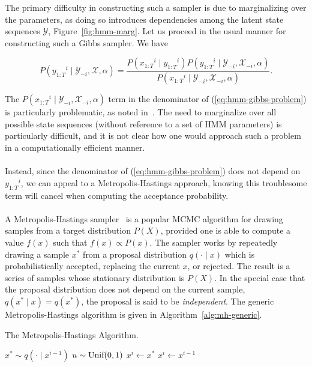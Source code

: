 \documentclass[12pt]{report}
\newcommand{\1}[0]{\mathbbm{1}}
\newcommand{\Unif}[0]{\textnormal{Unif}}
\newcommand{\seq}[3]{\ensuremath{#1_{{#2}:{#3}}}}
\begin{document}
The primary difficulty in constructing such a sampler is due to \mbox{marginalizing} over the parameters,
as doing so introduces dependencies among the latent state sequences $\mathcal{Y}$, Figure~\ref{fig:hmm-marg}.
Let us proceed in the usual manner for constructing such a Gibbs sampler. We have

\begin{equation}
    P(\seq{y}{1}{T}^i \mid \mathcal{Y}_{-i}, \mathcal{X}, \alpha)
    = \frac{P(\seq{x}{1}{T}^i \mid \seq{y}{1}{T}^i)P(\seq{y}{1}{T}^i \mid \mathcal{Y}_{-i}, \mathcal{X}_{-i}, \alpha)}
      {P(\seq{x}{1}{T}^i \mid \mathcal{Y}_{-i}, \mathcal{X}_{-i}, \alpha)}. \label{eq:hmm-gibbs-problem}
\end{equation}

The $P(\seq{x}{1}{T}^i \mid \mathcal{Y}_{-i}, \mathcal{X}_{-i}, \alpha)$ term in the denominator
of (\ref{eq:hmm-gibbs-problem}) is particularly problematic, as noted in~\cite{pcfg-bayesian-johnson}.
The need to marginalize over all possible state sequences (without reference to a set of \ac{HMM} parameters)
is particularly difficult, and it is not clear how one would approach such a problem
in a computationally efficient manner.
\\\\
Instead, since the denominator of (\ref{eq:hmm-gibbs-problem}) does not depend on $\seq{y}{1}{T}^i$,
we can appeal to a Metropolis-Hastings approach, knowing this troublesome term will cancel when
computing the acceptance probability.
\\\\
A Metropolis-Hastings sampler~\cite{mcmc-ml} is a popular \ac{MCMC} algorithm for drawing samples
from a target distribution $P(X)$, provided one is able to compute a value
$f(x)$ such that $f(x) \propto P(x)$. The sampler works by repeatedly drawing a
sample $x^*$ from a proposal distribution $q(\cdot \mid x)$ which is probabilistically
accepted, replacing the current $x$, or rejected. The result is a series of samples
whose stationary distribution is $P(X)$. In the special case that the proposal distribution
does not depend on the current sample, $q(x^* \mid x) = q(x^*)$, the proposal is said to
be \emph{independent}. The generic Metropolis-Hastings algorithm is given in Algorithm~\ref{alg:mh-generic}.

\begin{algorithm}[H]
    \caption{The Metropolis-Hastings Algorithm.\label{alg:mh-generic}}
    \begin{algorithmic}[1]
            \State $x^* \sim q(\cdot \mid x^{i-1})$
            \State $u \sim \Unif(0, 1)$
                \State $x^i \gets x^*$
            \Else
                \State $x^i \gets x^{i-1}$
            \EndIf
        \EndFor
        \State {}
    \end{algorithmic}
\end{algorithm}
\end{document}

